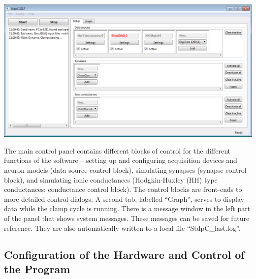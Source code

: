 \documentclass{article}
\begin{document}
\parbox{\textwidth}{
  \includegraphics[width=\textwidth]{main}
}
\vspace*{0.5cm}

The main control panel contains different blocks of control for the
different functions of the software -- setting up and configuring acquisition
devices and neuron models (data source control block), simulating synapses
(synapse control block), and simulating ionic conductances (Hodgkin-Huxley (HH)
type conductances; conductance control block). The control blocks are front-ends to
more detailed control dialogs. A second tab, labelled ``Graph'', serves
to display data while the clamp cycle is running. There is a message window in the
left part of the panel that shows system messages. These messages can
be saved for future reference. They are also automatically written to
a local file ``StdpC\_last.log''.


\subsection{Configuration of the Hardware and Control of the Program}
\end{document}
